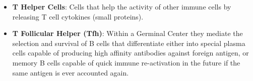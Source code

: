 \documentclass[english]{article}
\begin{document}
\begin{itemize}
\item \textbf{T Helper Cells}: Cells that help the activity of other immune cells by releasing T cell cytokines (small proteins).

\item \textbf{T Follicular Helper (Tfh)}: Within a Germinal Center they mediate the selection and survival of B cells that differentiate either into special plasma cells capable of producing high affinity antibodies against foreign antigen, or memory B cells capable of quick immune re-activation in the future if the same antigen is ever accounted again. 


\end{itemize}
\end{document}
